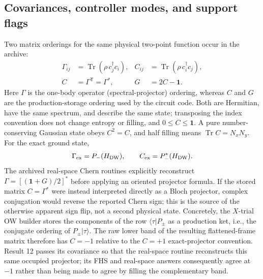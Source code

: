 \documentclass[aps,prb,twocolumn,floatfix,nofootinbib,superscriptaddress]{revtex4-2}
\newcommand{\Tr}{\operatorname{Tr}}
\begin{document}
\subsection{Covariances, controller modes, and support flags}
\label{sec:covariance-controller}

Two matrix orderings for the same physical two-point function occur in the archive:
\begin{equation}
 \begin{aligned}
 \Gamma_{ij}&=\Tr(\rho\,c_j^\dagger c_i),
 &C_{ij}&=\Tr(\rho\,c_i^\dagger c_j),\\
 C&=\Gamma^{\mathsf T}=\Gamma^*,
 &G&=2C-\mathbf{1}.
 \end{aligned}
 \label{eq:covariance-definition}
\end{equation}
Here $\Gamma$ is the one-body operator (spectral-projector) ordering, whereas $C$ and
$G$ are the production-storage ordering used by the circuit code.  Both are Hermitian,
have the same spectrum, and describe the same state; transposing the index convention
does not change entropy or filling, and $0\leq C\leq\mathbf{1}$.  A pure
number-conserving Gaussian state obeys
$C^2=C$, and half filling means $\Tr C=N_xN_y$.  For the exact ground state,
\begin{equation}
 \Gamma_{\rm ex}=P_-(H_{\rm DW}),
 \qquad C_{\rm ex}=P_-^*(H_{\rm DW}).
 \label{eq:exact-projector-convention}
\end{equation}
The archived real-space Chern routines explicitly reconstruct
$\Gamma=[(\mathbf{1}+G)/2]^*$ before applying an oriented projector formula.  If the
stored matrix $C=\Gamma^*$ were instead interpreted directly as a Bloch projector,
complex conjugation would reverse the reported Chern sign; this is the source of the
otherwise apparent sign flip, not a second physical state.
Concretely, the $X$-trial OW builder stores the components of the row
$\langle\tau|P_\pm$ as a production ket, i.e., the conjugate ordering of
$P_\pm|\tau\rangle$.  The raw lower band of the resulting flattened-frame matrix therefore
has $C=-1$ relative to the $C=+1$ exact-projector convention.  Result 12 passes its
covariance so that the real-space routine reconstructs this same occupied projector; its
FHS and real-space answers consequently agree at $-1$ rather than being made to agree by
filling the complementary band.
\end{document}
